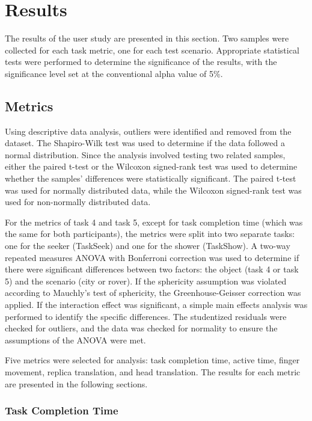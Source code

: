 \section{Results}

    The results of the user study are presented in this section. Two samples were collected for each task metric, one for each test scenario. Appropriate statistical tests were performed to determine the significance of the results, with the significance level set at the conventional alpha value of 5\%.

    \subsection{Metrics}

        Using descriptive data analysis, outliers were identified and removed from the dataset. The Shapiro-Wilk test \cite{shapiroAnalysisVarianceTest1965} was used to determine if the data followed a normal distribution. Since the analysis involved testing two related samples, either the paired t-test or the Wilcoxon signed-rank test \cite{wilcoxonIndividualComparisonsRanking1945} was used to determine whether the samples' differences were statistically significant. The paired t-test was used for normally distributed data, while the Wilcoxon signed-rank test was used for non-normally distributed data.

        For the metrics of task 4 and task 5, except for task completion time (which was the same for both participants), the metrics were split into two separate tasks: one for the seeker (TaskSeek) and one for the shower (TaskShow). A two-way repeated measures ANOVA with Bonferroni correction was used to determine if there were significant differences between two factors: the object (task 4 or task 5) and the scenario (city or rover). If the sphericity assumption was violated according to Mauchly's test of sphericity, the Greenhouse-Geisser correction was applied. If the interaction effect was significant, a simple main effects analysis was performed to identify the specific differences. The studentized residuals were checked for outliers, and the data was checked for normality to ensure the assumptions of the ANOVA were met.

        Five metrics were selected for analysis: task completion time, active time, finger movement, replica translation, and head translation. The results for each metric are presented in the following sections.

        \subsubsection{Task Completion Time}

